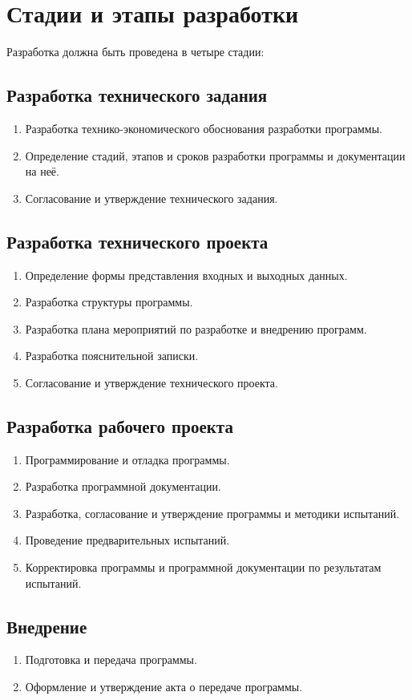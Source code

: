 \section{Стадии и этапы разработки}

Разработка должна быть проведена в четыре стадии: 

\subsection{Разработка технического задания}
\begin{enumerate}
	\item Разработка технико-экономического обоснования разработки программы.
	\item Определение стадий, этапов и сроков разработки программы и документации на неё.
	\item Согласование и утверждение технического задания.
\end{enumerate}
\subsection{Разработка технического проекта}
\begin{enumerate}
	\item Определение формы представления входных и выходных данных.
	\item Разработка структуры программы.
	\item Разработка плана мероприятий по разработке и внедрению программ.
	\item Разработка пояснительной записки.
	\item Согласование и утверждение технического проекта.
\end{enumerate}

\subsection{Разработка рабочего проекта}
\begin{enumerate}
	\item Программирование и отладка программы.
	\item Разработка программной документации.
	\item Разработка, согласование и утверждение программы и методики испытаний.
	\item Проведение предварительных испытаний.
	\item Корректировка программы и программной документации по результатам испытаний.
\end{enumerate}
\subsection{Внедрение}
\begin{enumerate}
	\item Подготовка и передача программы.
	\item Оформление и утверждение акта о передаче программы.
\end{enumerate}